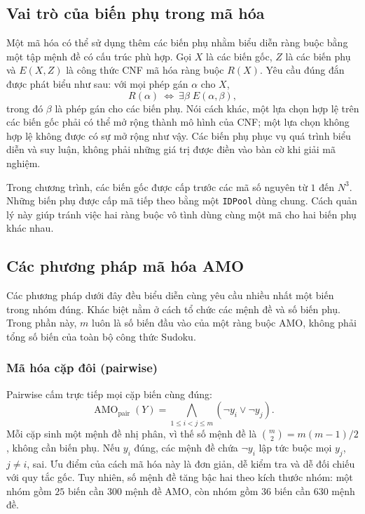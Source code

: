 \documentclass[a4paper,fleqn]{cas-sc}
\begin{document}
\subsection{Vai trò của biến phụ trong mã hóa}

Một mã hóa có thể sử dụng thêm các biến phụ nhằm biểu diễn ràng buộc
bằng một tập mệnh đề có cấu trúc phù hợp. Gọi $X$ là các biến gốc,
$Z$ là các biến phụ và $E(X,Z)$ là công thức CNF mã hóa ràng buộc $R(X)$.
Yêu cầu đúng đắn được phát biểu như sau: với mọi phép gán $\alpha$ cho $X$,
\begin{equation}
 R(\alpha)\ \Longleftrightarrow\
 \exists\beta\; E(\alpha,\beta),
 \label{eq:theory-encoding-correctness}
\end{equation}
trong đó $\beta$ là phép gán cho các biến phụ. Nói cách khác, một lựa chọn
hợp lệ trên các biến gốc phải có thể mở rộng thành mô hình của CNF;
một lựa chọn không hợp lệ không được có sự mở rộng như vậy.
Các biến phụ phục vụ quá trình biểu diễn và suy luận, không phải những
giá trị được điền vào bàn cờ khi giải mã nghiệm.

Trong chương trình, các biến gốc được cấp trước các mã số nguyên từ
$1$ đến $N^3$. Những biến phụ được cấp mã tiếp theo bằng một
\texttt{IDPool} dùng chung. Cách quản lý này giúp tránh việc hai ràng buộc
vô tình dùng cùng một mã cho hai biến phụ khác nhau.

\subsection{Các phương pháp mã hóa AMO}

Các phương pháp dưới đây đều biểu diễn cùng yêu cầu nhiều nhất một biến
trong nhóm đúng. Khác biệt nằm ở cách tổ chức các mệnh đề và số biến phụ.
Trong phần này, $m$ luôn là số biến đầu vào của một ràng buộc AMO,
không phải tổng số biến của toàn bộ công thức Sudoku.

\subsubsection{Mã hóa cặp đôi (pairwise)}

Pairwise cấm trực tiếp mọi cặp biến cùng đúng:
\begin{equation}
 \operatorname{AMO}_{\mathrm{pair}}(Y)=
 \bigwedge_{1\leq i<j\leq m}(\neg y_i\lor\neg y_j).
 \label{eq:theory-pairwise}
\end{equation}
Mỗi cặp sinh một mệnh đề nhị phân, vì thế số mệnh đề là
$\binom{m}{2}=m(m-1)/2$, không cần biến phụ. Nếu $y_i$ đúng, các mệnh đề
chứa $\neg y_i$ lập tức buộc mọi $y_j$, $j\neq i$, sai. Ưu điểm của cách
mã hóa này là đơn giản, dễ kiểm tra và dễ đối chiếu với quy tắc gốc.
Tuy nhiên, số mệnh đề tăng bậc hai theo kích thước nhóm: một nhóm gồm
$25$ biến cần $300$ mệnh đề AMO, còn nhóm gồm $36$ biến cần $630$ mệnh đề.
\end{document}
